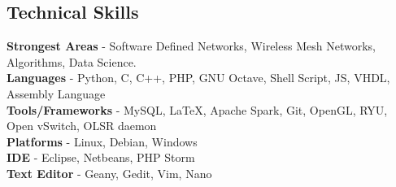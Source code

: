 \documentclass{resume}
\begin{document}
\begin{multicols}{2}

\section{Technical Skills}

\textbf{Strongest Areas} - Software Defined Networks, Wireless Mesh Networks, Algorithms, Data Science.\\[.05in]
\textbf{Languages} - Python, C, C++, PHP, GNU Octave, Shell Script, JS, VHDL, Assembly Language\\[.05in]
\textbf{Tools/Frameworks} - MySQL, \LaTeX, Apache Spark, Git, OpenGL, RYU, Open vSwitch, OLSR daemon\\[.05in]
\textbf{Platforms} - Linux, Debian, Windows \\[.05in]
\textbf{IDE} - Eclipse, Netbeans, PHP Storm\\[.05in]
\textbf{Text Editor} - Geany, Gedit, Vim, Nano\\[.05in]





\end{multicols}
\end{document}
